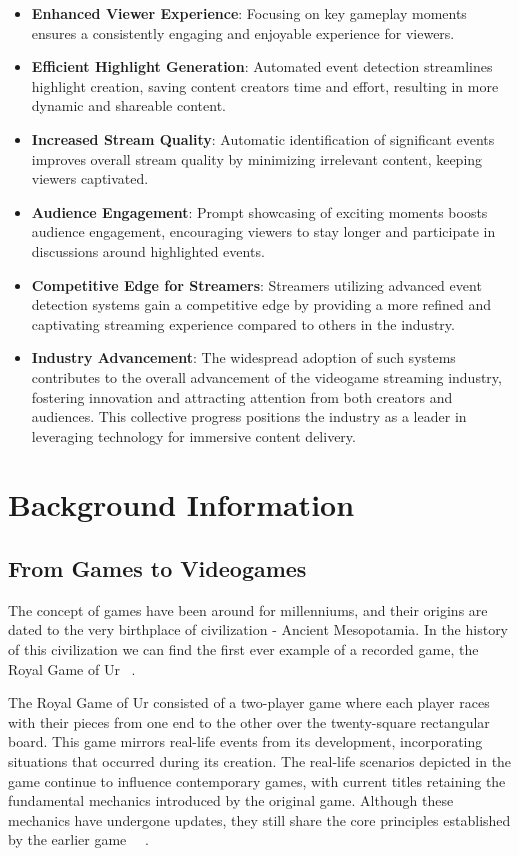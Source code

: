 \begin{itemize}
    \item \textbf{Enhanced Viewer Experience}: Focusing on key gameplay moments ensures a consistently engaging and enjoyable experience for viewers.
    \item \textbf{Efficient Highlight Generation}: Automated event detection streamlines highlight creation, saving content creators time and effort, resulting in more dynamic and shareable content.
    \item \textbf{Increased Stream Quality}: Automatic identification of significant events improves overall stream quality by minimizing irrelevant content, keeping viewers captivated.
    \item \textbf{Audience Engagement}: Prompt showcasing of exciting moments boosts audience engagement, encouraging viewers to stay longer and participate in discussions around highlighted events.
    \item \textbf{Competitive Edge for Streamers}: Streamers utilizing advanced event detection systems gain a competitive edge by providing a more refined and captivating streaming experience compared to others in the industry.
    \item \textbf{Industry Advancement}: The widespread adoption of such systems contributes to the overall advancement of the videogame streaming industry, fostering innovation and attracting attention from both creators and audiences. This collective progress positions the industry as a leader in leveraging technology for immersive content delivery.
\end{itemize}

\section{Background Information}
\subsection{From Games to Videogames}    
    The concept of games have been around for millenniums, and their origins are dated to the very birthplace of civilization - Ancient Mesopotamia. In the history of this civilization we can find the first ever example of a recorded game, the Royal Game of Ur ~\cite{Videogames_IntroductionToTheIndutry}.

    The Royal Game of Ur consisted of a two-player game where each player races with their pieces from one end to the other over the twenty-square rectangular board. This game mirrors real-life events from its development, incorporating situations that occurred during its creation. The real-life scenarios depicted in the game continue to influence contemporary games, with current titles retaining the fundamental mechanics introduced by the original game. Although these mechanics have undergone updates, they still share the core principles established by the earlier game ~\cite{Videogames_IntroductionToTheIndutry}~\cite{RoyalGameUr_rules}.

